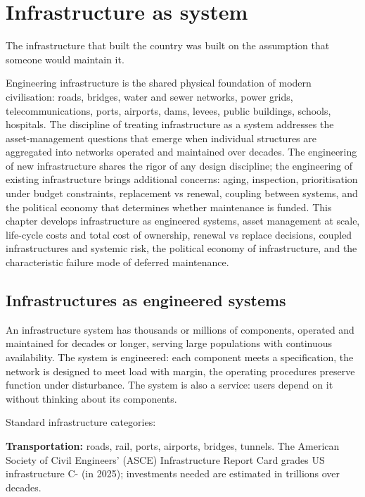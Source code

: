 \chapter{Infrastructure as system}
\label{vol09:ch15}

\epigraph{The infrastructure that built the country was built on the assumption that someone would maintain it.}{}


\noindent
Engineering infrastructure is the shared physical foundation of modern civilisation: roads, bridges, water and sewer networks, power grids, telecommunications, ports, airports, dams, levees, public buildings, schools, hospitals. The discipline of treating infrastructure as a system addresses the asset-management questions that emerge when individual structures are aggregated into networks operated and maintained over decades. The engineering of new infrastructure shares the rigor of any design discipline; the engineering of existing infrastructure brings additional concerns: aging, inspection, prioritisation under budget constraints, replacement vs renewal, coupling between systems, and the political economy that determines whether maintenance is funded. This chapter develops infrastructure as engineered systems, asset management at scale, life-cycle costs and total cost of ownership, renewal vs replace decisions, coupled infrastructures and systemic risk, the political economy of infrastructure, and the characteristic failure mode of deferred maintenance.

\section{Infrastructures as engineered systems}

An infrastructure system has thousands or millions of components, operated and maintained for decades or longer, serving large populations with continuous availability. The system is engineered: each component meets a specification, the network is designed to meet load with margin, the operating procedures preserve function under disturbance. The system is also a service: users depend on it without thinking about its components.

Standard infrastructure categories:

\textbf{Transportation:} roads, rail, ports, airports, bridges, tunnels. The American Society of Civil Engineers' (ASCE) Infrastructure Report Card grades US infrastructure C- (in 2025); investments needed are estimated in trillions over decades.

